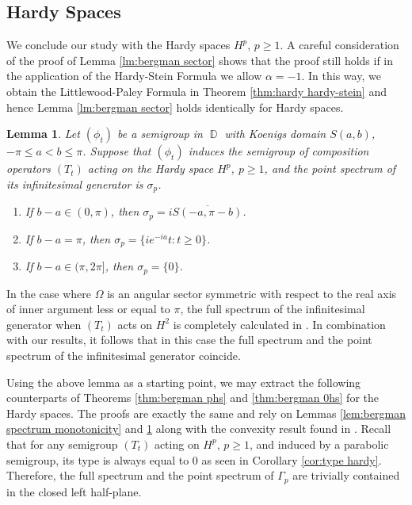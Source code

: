 \documentclass[11pt]{amsart}
\numberwithin{equation}{section}
\newtheorem{lemma}[theorem]{Lemma}
\theoremstyle{definition}
\DeclareMathOperator{\D}{\mathbb{D}}
\begin{document}
	
	\subsection{Hardy Spaces}
	We conclude our study with the Hardy spaces $H^p$, $p\ge1$. A careful consideration of the proof of Lemma \ref{lm:bergman sector} shows that the proof still holds if in the application of the Hardy-Stein Formula we allow $\alpha=-1$. In this way, we obtain the Littlewood-Paley Formula in Theorem \ref{thm:hardy hardy-stein} and hence Lemma \ref{lm:bergman sector} holds identically for Hardy spaces.
	
	\begin{lemma}\label{lm:hardy sector}
		Let $(\phi_t)$ be a semigroup in $\D$ with Koenigs domain $S(a,b)$, $-\pi\le a<b\le\pi$. Suppose that $(\phi_t)$ induces the semigroup of composition operators $(T_t)$ acting on the Hardy space $H^p$, $p\ge1$, and the point spectrum of its infinitesimal generator is $\sigma_p$.
		\begin{enumerate}
			\item[\textup{(a)}] If $b-a\in(0,\pi)$, then $\sigma_p=i\overline{S(-a,\pi-b)}$.
			\item[\textup{(b)}] If $b-a=\pi$, then $\sigma_p=\{ie^{-ia}t:t\ge0\}$.
			\item[\textup{(c)}] If $b-a\in(\pi,2\pi]$, then $\sigma_p=\{0\}$.
		\end{enumerate}
	\end{lemma}
	
	In the case where $\Omega$ is an angular sector symmetric with respect to the real axis of inner argument less or equal to $\pi$, the full spectrum of the infinitesimal generator when $(T_t)$ acts on $H^2$ is completely calculated in \cite[Corollary 7.42]{Cowen-Maccluer}. In combination with our results, it follows that in this case the full spectrum and the point spectrum of the infinitesimal generator coincide.
	
	Using the above lemma as a starting point, we may extract the following counterparts of Theorems \ref{thm:bergman phs} and \ref{thm:bergman 0hs} for the Hardy spaces. The proofs are exactly the same and rely on Lemmas \ref{lem:bergman spectrum monotonicity} and \ref{lm:hardy sector} along with the convexity result found in \cite[Proposition 5]{betsakos_eig}. Recall that for any semigroup $(T_t)$ acting on $H^p$, $p\ge1$, and induced by a parabolic semigroup, its type is always equal to $0$ as seen in Corollary \ref{cor:type hardy}. Therefore, the full spectrum and the point spectrum of $\Gamma_p$ are trivially contained in the closed left half-plane.
	
\end{document}
